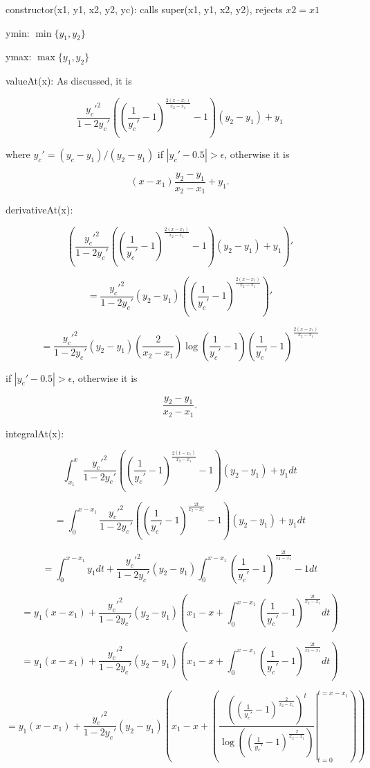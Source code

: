 \documentclass{article}
\begin{document}
constructor(x1, y1, x2, y2, yc): calls super(x1, y1, x2, y2), rejects $x2 = x1$

ymin: $\min\{y_1,y_2\}$

ymax: $\max\{y_1,y_2\}$

valueAt(x): As discussed, it is

$$\frac{y_c'^2}{1-2y_c'}\left(\left(\frac{1}{y_c'}-1\right)^{\frac{2(x-x_1)}{x_2-x_1}}-1\right)(y_2-y_1)+y_1$$

where $y_c'=(y_c-y_1)/(y_2-y_1)$ if $|y_c'-0.5| > \epsilon$, otherwise it is

$$(x-x_1)\frac{y_2-y_1}{x_2-x_1} + y_1.$$

derivativeAt(x): 

$$\left(\frac{y_c'^2}{1-2y_c'}\left(\left(\frac{1}{y_c'}-1\right)^{\frac{2(x-x_1)}{x_2-x_1}}-1\right)(y_2-y_1)+y_1\right)'$$

$$=\frac{y_c'^2}{1-2y_c'}\left(y_2-y_1\right)\left(\left(\frac{1}{y_c'}-1\right)^{\frac{2\left(x-x_1\right)}{x_2-x_1}}\right)'$$

$$=\boxed{\frac{y_c'^2}{1-2y_c'}\left(y_2-y_1\right)\left(\frac{2}{x_2-x_1}\right)\log\left(\frac{1}{y_c'}-1\right)\left(\frac{1}{y_c'}-1\right)^{\frac{2(x-x_1)}{x_2-x_1}}}$$

if $|y_c'-0.5| > \epsilon$, otherwise it is

$$\frac{y_2-y_1}{x_2-x_1}.$$

integralAt(x):

$$\int_{x_1}^{x}\frac{y_c'^2}{1-2y_c'}\left(\left(\frac{1}{y_c'}-1\right)^{\frac{2(t-x_1)}{x_2-x_1}}-1\right)(y_2-y_1)+y_1 dt$$

$$=\int_{0}^{x-x_1}\frac{y_c'^2}{1-2y_c'}\left(\left(\frac{1}{y_c'}-1\right)^{\frac{2t}{x_2-x_1}}-1\right)(y_2-y_1)+y_1 dt$$

$$=\int_{0}^{x-x_1}y_1 dt + \frac{y_c'^2}{1-2y_c'} (y_2-y_1) \int_{0}^{x-x_1} \left(\frac{1}{y_c'}-1\right)^{\frac{2t}{x_2-x_1}}-1 dt$$

$$=y_1(x-x_1)+\frac{y_c'^2}{1-2y_c'} (y_2-y_1)\left(x_1 - x + \int_{0}^{x-x_1} \left(\frac{1}{y_c'}-1\right)^{\frac{2t}{x_2-x_1}}dt\right)$$

$$=y_1(x-x_1)+\frac{y_c'^2}{1-2y_c'} (y_2-y_1)\left(x_1 - x + \int_{0}^{x-x_1} \left(\frac{1}{y_c'}-1\right)^{\frac{2t}{x_2-x_1}}dt\right)$$

$$=y_1(x-x_1)+\frac{y_c'^2}{1-2y_c'}(y_2-y_1) \left(x_1 - x + \left(\left. \frac{\left(\left(\frac{1}{y_c'}-1\right)^\frac{2}{x_2-x_1}\right)^t}{\log\left(\left(\frac{1}{y_c'}-1\right)^\frac{2}{x_2-x_1}\right)} \right\vert_{t=0}^{t=x-x_1}\right)\right)$$
\end{document}
